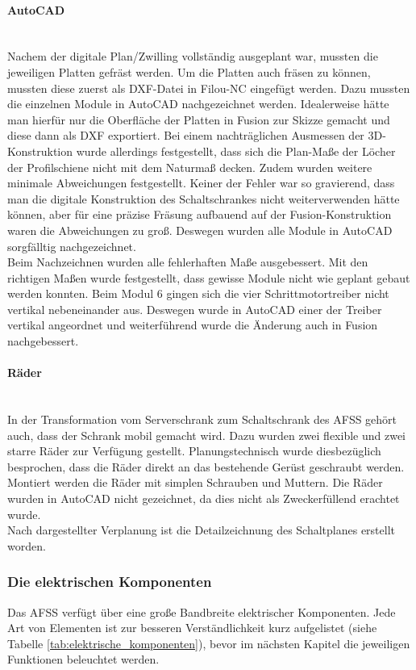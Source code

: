     \paragraph{AutoCAD}\label{AutoCAD}\mbox{}\\
    Nachem der digitale Plan/Zwilling vollständig ausgeplant war, mussten die jeweiligen Platten gefräst werden. Um die Platten auch fräsen zu können, mussten diese zuerst als DXF-Datei in Filou-NC eingefügt werden. Dazu mussten die einzelnen Module in AutoCAD nachgezeichnet werden. Idealerweise hätte man hierfür nur die Oberfläche der Platten in Fusion zur Skizze gemacht und diese dann als DXF exportiert. Bei einem nachträglichen Ausmessen der 3D-Konstruktion wurde allerdings festgestellt, dass sich die Plan-Maße der Löcher der Profilschiene nicht mit dem Naturmaß decken. Zudem wurden weitere minimale Abweichungen festgestellt. Keiner der Fehler war so gravierend, dass man die digitale Konstruktion des Schaltschrankes nicht weiterverwenden hätte können, aber für eine präzise Fräsung aufbauend auf der Fusion-Konstruktion waren die Abweichungen zu groß. Deswegen wurden alle Module in AutoCAD sorgfälltig nachgezeichnet.\\     
    Beim Nachzeichnen wurden alle fehlerhaften Maße ausgebessert. Mit den richtigen Maßen wurde festgestellt, dass gewisse Module nicht wie geplant gebaut werden konnten. Beim Modul 6 gingen sich die vier Schrittmotortreiber nicht vertikal nebeneinander aus. Deswegen wurde in AutoCAD einer der Treiber vertikal angeordnet und weiterführend wurde die Änderung auch in Fusion nachgebessert.
    \paragraph{Räder}\mbox{}\\
    In der Transformation vom Serverschrank zum Schaltschrank des AFSS gehört auch, dass der Schrank mobil gemacht wird. Dazu wurden zwei flexible und zwei starre Räder zur Verfügung gestellt. Planungstechnisch wurde diesbezüglich besprochen, dass die Räder direkt an das bestehende Gerüst geschraubt werden. Montiert werden die Räder mit simplen Schrauben und Muttern. Die Räder wurden in AutoCAD nicht gezeichnet, da dies nicht als Zweckerfüllend erachtet wurde.\\
    Nach dargestellter Verplanung ist die Detailzeichnung des Schaltplanes erstellt worden.
    \newpage
\subsubsection{Die elektrischen Komponenten}
\label{sec:Die elektrischen Komponenten}
    Das AFSS verfügt über eine große  Bandbreite elektrischer Komponenten. Jede Art von Elementen ist zur besseren Verständlichkeit kurz aufgelistet (siehe Tabelle \ref{tab:elektrische_komponenten}), bevor im nächsten Kapitel die jeweiligen Funktionen beleuchtet werden.
